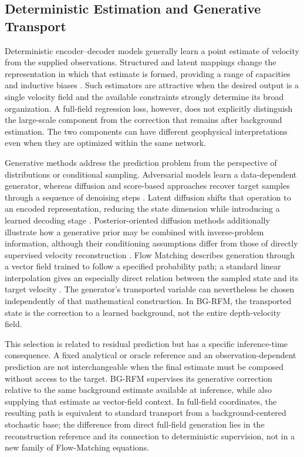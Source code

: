 \subsection{Deterministic Estimation and Generative Transport}

Deterministic encoder--decoder models generally learn a point estimate of velocity from the supplied observations. Structured and latent mappings change the representation in which that estimate is formed, providing a range of capacities and inductive biases \citep{yang2019deeplearning,wu2020inversionnet,feng2024autolinear,gupta2025gfi}. Such estimators are attractive when the desired output is a single velocity field and the available constraints strongly determine its broad organization. A full-field regression loss, however, does not explicitly distinguish the large-scale component from the correction that remains after background estimation. The two components can have different geophysical interpretations even when they are optimized within the same network.

Generative methods address the prediction problem from the perspective of distributions or conditional sampling. Adversarial models learn a data-dependent generator, whereas diffusion and score-based approaches recover target samples through a sequence of denoising steps \citep{ho2020ddpm,song2021scorebased}. Latent diffusion shifts that operation to an encoded representation, reducing the state dimension while introducing a learned decoding stage \citep{rombach2022ldm}. Posterior-oriented diffusion methods additionally illustrate how a generative prior may be combined with inverse-problem information, although their conditioning assumptions differ from those of directly supervised velocity reconstruction \citep{chung2023diffusionposterior}. Flow Matching describes generation through a vector field trained to follow a specified probability path; a standard linear interpolation gives an especially direct relation between the sampled state and its target velocity \citep{lipman2023flowmatching,liu2023rectifiedflow}. The generator's transported variable can nevertheless be chosen independently of that mathematical construction. In BG-RFM, the transported state is the correction to a learned background, not the entire depth-velocity field.

This selection is related to residual prediction but has a specific inference-time consequence. A fixed analytical or oracle reference and an observation-dependent prediction are not interchangeable when the final estimate must be composed without access to the target. BG-RFM supervises its generative correction relative to the same background estimate available at inference, while also supplying that estimate as vector-field context. In full-field coordinates, the resulting path is equivalent to standard transport from a background-centered stochastic base; the difference from direct full-field generation lies in the reconstruction reference and its connection to deterministic supervision, not in a new family of Flow-Matching equations.


